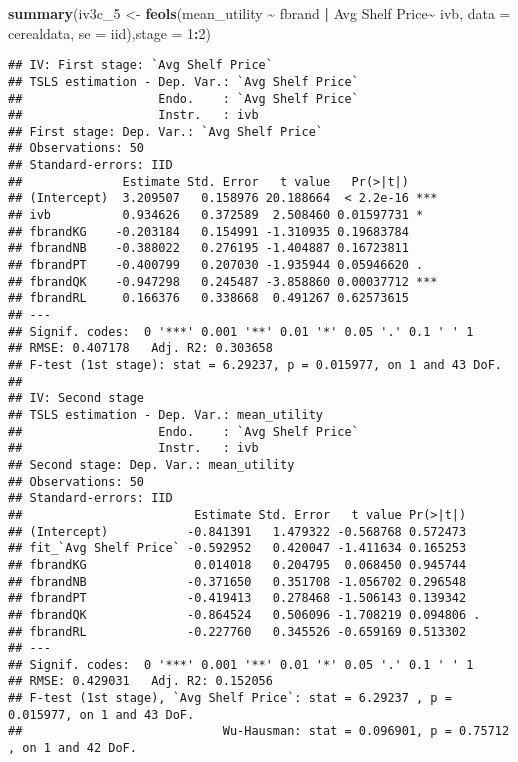 \documentclass[
]{article}
\newenvironment{Shaded}{\begin{snugshade}}{\end{snugshade}}
\newcommand{\AttributeTok}[1]{\textcolor[rgb]{0.13,0.29,0.53}{#1}}
\newcommand{\DecValTok}[1]{\textcolor[rgb]{0.00,0.00,0.81}{#1}}
\newcommand{\FunctionTok}[1]{\textcolor[rgb]{0.13,0.29,0.53}{\textbf{#1}}}
\newcommand{\NormalTok}[1]{#1}
\newcommand{\OtherTok}[1]{\textcolor[rgb]{0.56,0.35,0.01}{#1}}
\newcommand{\SpecialCharTok}[1]{\textcolor[rgb]{0.81,0.36,0.00}{\textbf{#1}}}
\newcommand{\StringTok}[1]{\textcolor[rgb]{0.31,0.60,0.02}{#1}}
\begin{document}
\begin{Shaded}
\begin{Highlighting}[]
\FunctionTok{summary}\NormalTok{(iv3c\_5 }\OtherTok{\textless{}{-}} \FunctionTok{feols}\NormalTok{(mean\_utility }\SpecialCharTok{\textasciitilde{}}\NormalTok{ fbrand }\SpecialCharTok{|}  \StringTok{\textasciigrave{}}\AttributeTok{Avg Shelf Price}\StringTok{\textasciigrave{}}\SpecialCharTok{\textasciitilde{}}\NormalTok{ ivb, }\AttributeTok{data =}\NormalTok{ cerealdata,}
                     \AttributeTok{se =} \StringTok{\textquotesingle{}iid\textquotesingle{}}\NormalTok{),}\AttributeTok{stage =} \DecValTok{1}\SpecialCharTok{:}\DecValTok{2}\NormalTok{)}
\end{Highlighting}
\end{Shaded}

\begin{verbatim}
## IV: First stage: `Avg Shelf Price`
## TSLS estimation - Dep. Var.: `Avg Shelf Price`
##                   Endo.    : `Avg Shelf Price`
##                   Instr.   : ivb
## First stage: Dep. Var.: `Avg Shelf Price`
## Observations: 50
## Standard-errors: IID 
##              Estimate Std. Error   t value   Pr(>|t|)    
## (Intercept)  3.209507   0.158976 20.188664  < 2.2e-16 ***
## ivb          0.934626   0.372589  2.508460 0.01597731 *  
## fbrandKG    -0.203184   0.154991 -1.310935 0.19683784    
## fbrandNB    -0.388022   0.276195 -1.404887 0.16723811    
## fbrandPT    -0.400799   0.207030 -1.935944 0.05946620 .  
## fbrandQK    -0.947298   0.245487 -3.858860 0.00037712 ***
## fbrandRL     0.166376   0.338668  0.491267 0.62573615    
## ---
## Signif. codes:  0 '***' 0.001 '**' 0.01 '*' 0.05 '.' 0.1 ' ' 1
## RMSE: 0.407178   Adj. R2: 0.303658
## F-test (1st stage): stat = 6.29237, p = 0.015977, on 1 and 43 DoF.
## 
## IV: Second stage
## TSLS estimation - Dep. Var.: mean_utility
##                   Endo.    : `Avg Shelf Price`
##                   Instr.   : ivb
## Second stage: Dep. Var.: mean_utility
## Observations: 50
## Standard-errors: IID 
##                        Estimate Std. Error   t value Pr(>|t|)    
## (Intercept)           -0.841391   1.479322 -0.568768 0.572473    
## fit_`Avg Shelf Price` -0.592952   0.420047 -1.411634 0.165253    
## fbrandKG               0.014018   0.204795  0.068450 0.945744    
## fbrandNB              -0.371650   0.351708 -1.056702 0.296548    
## fbrandPT              -0.419413   0.278468 -1.506143 0.139342    
## fbrandQK              -0.864524   0.506096 -1.708219 0.094806 .  
## fbrandRL              -0.227760   0.345526 -0.659169 0.513302    
## ---
## Signif. codes:  0 '***' 0.001 '**' 0.01 '*' 0.05 '.' 0.1 ' ' 1
## RMSE: 0.429031   Adj. R2: 0.152056
## F-test (1st stage), `Avg Shelf Price`: stat = 6.29237 , p = 0.015977, on 1 and 43 DoF.
##                            Wu-Hausman: stat = 0.096901, p = 0.75712 , on 1 and 42 DoF.
\end{verbatim}
\end{document}
